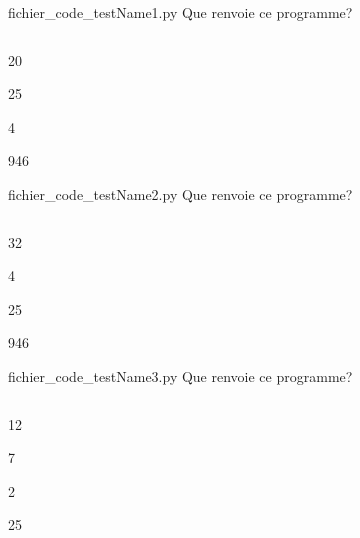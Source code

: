 \begin{multi}
      {fichier_code_testName1.py}
      Que renvoie ce programme?
      \inputminted{python}{fichier_code_testName1.py}
            \item*20
            \item25
            \item4
            \item946
    \end{multi}
\begin{multi}
      {fichier_code_testName2.py}
      Que renvoie ce programme?
      \inputminted{python}{fichier_code_testName2.py}
            \item*32
            \item4
            \item25
            \item946
    \end{multi}
\begin{multi}
      {fichier_code_testName3.py}
      Que renvoie ce programme?
      \inputminted{python}{fichier_code_testName3.py}
            \item*12
            \item7
            \item2
            \item25
    \end{multi}
